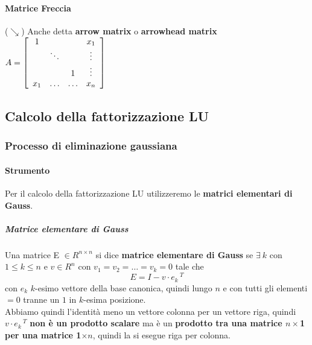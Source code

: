 \documentclass[10pt]{book}
\begin{document}
\paragraph{Matrice Freccia} ($\searrow$) Anche detta \textbf{arrow matrix} o \textbf{arrowhead matrix} \begin{math}
A = \left[
\begin{array}{c c c c}
	1 & & & x_1\\
	& \ddots & & \vdots\\
	& & 1 & \vdots\\
	x_1 & \ldots & \ldots & x_n
\end{array}
\right]
\end{math}
\subsection{Calcolo della fattorizzazione LU}
\subsubsection{Processo di eliminazione gaussiana}
\paragraph{Strumento} Per il calcolo della fattorizzazione LU utilizzeremo le \textbf{matrici elementari di Gauss}.
\subparagraph{Matrice elementare di Gauss} Una matrice E $\in R^{n\times n}$ si dice \textbf{matrice elementare di Gauss} se $\exists\: k$ con $1 \leq k \leq n$ e $v \in R^n$ con $v_1 = v_2 = \ldots = v_k = 0$ tale che $$E = I - v\cdot e_k\,^T$$
con $e_k$ $k$-esimo vettore della base canonica, quindi lungo $n$ e con tutti gli elementi $= 0$ tranne un $1$ in $k$-esima posizione.\\
Abbiamo quindi l'identità meno un vettore colonna per un vettore riga, quindi $v\cdot e_k\,^T$ \textbf{non è un prodotto scalare} ma è un \textbf{prodotto tra una matrice $n\times$1 per una matrice 1$\times n$}, quindi la si esegue riga per colonna.
\pagebreak
\end{document}
